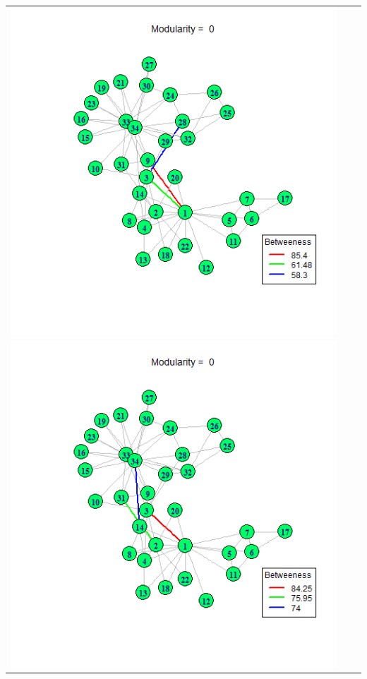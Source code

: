 \documentclass[letterpaper,11pt]{report}
\begin{document}
\begin{savenotes}
\begin{table}[htbp]
\begin{tabular}{ccc}
			\includegraphics[scale=0.28]{karateClub-community-0003.png} \\
			\includegraphics[scale=0.28]{karateClub-community-0004.png} &

\end{tabular}
\end{table}
\end{savenotes}
\end{document}
